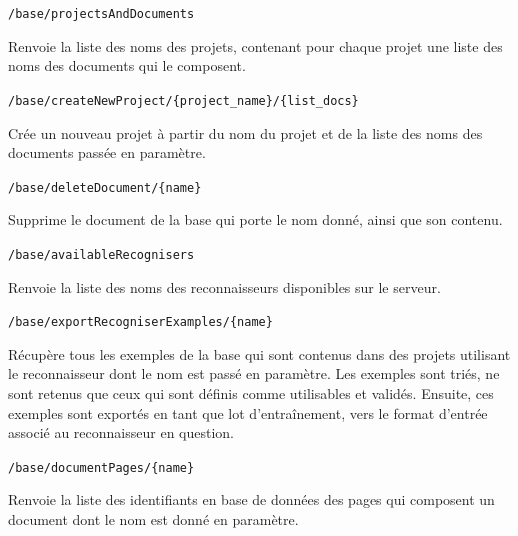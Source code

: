 \begin{description}[align=left]

\item [Général]

\item [GET] \texttt{/base/projectsAndDocuments}\newline{}
\begin{itshape}
Renvoie la liste des noms des projets, contenant pour chaque projet une liste des noms des documents qui le composent.
\end{itshape}

\item [POST] \texttt{/base/createNewProject/\{project\_name\}/\{list\_docs\}}\newline{}
\begin{itshape}
Crée un nouveau projet à partir du nom du projet et de la liste des noms des documents passée en paramètre.
\end{itshape}

\item [DELETE] \texttt{/base/deleteDocument/\{name\}}\newline{}
\begin{itshape}
Supprime le document de la base qui porte le nom donné, ainsi que son contenu.
\end{itshape}

\item [GET] \texttt{/base/availableRecognisers}\newline{}
\begin{itshape}
Renvoie la liste des noms des reconnaisseurs disponibles sur le serveur.
\end{itshape}

\item [POST] \texttt{/base/exportRecogniserExamples/\{name\}}\newline{}
\begin{itshape}
Récupère tous les exemples de la base qui sont contenus dans des projets utilisant le reconnaisseur dont le nom est passé en paramètre. Les exemples sont triés, ne sont retenus que ceux qui sont définis comme utilisables et validés. Ensuite, ces exemples sont exportés en tant que lot d'entraînement, vers le format d'entrée associé au reconnaisseur en question.
\end{itshape}

\item [Annotation / Validation]

\item [GET] \texttt{/base/documentPages/\{name\}}\newline{}
\begin{itshape}
Renvoie la liste des identifiants en base de données des pages qui composent un document dont le nom est donné en paramètre.
\end{itshape}


\end{description}
